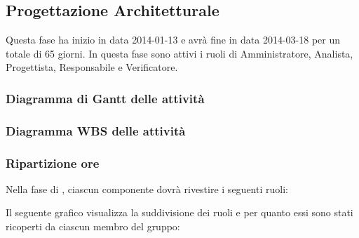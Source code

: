 \subsection{Progettazione Architetturale}
Questa fase ha inizio in data 2014-01-13 e avrà fine in data 2014-03-18 per un totale di 65 giorni. In questa fase sono attivi i ruoli di Amministratore, Analista, Progettista, Responsabile e Verificatore.

\subsubsection{Diagramma di Gantt delle attività}

\newpage
\subsubsection{Diagramma WBS delle attività}

\newpage
\subsubsection{Ripartizione ore}

\newpage
Nella fase di , ciascun componente dovrà rivestire i seguenti ruoli:

Il seguente grafico visualizza la suddivisione dei ruoli e per quanto essi sono stati ricoperti da ciascun membro del gruppo:
